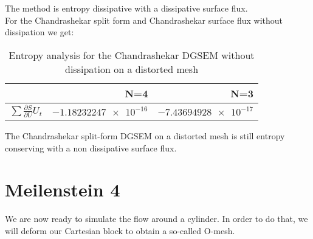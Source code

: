 \documentclass[11pt]{scrartcl}
\begin{document}
The method is entropy dissipative with a dissipative surface flux.\\
For the Chandrashekar split form and Chandrashekar surface flux without dissipation we get: \\
\begin{table}[H]
\centering
\begin{tabular}{|r|r|r|}
    \hline\hline
     & \textbf{N=4} & \textbf{N=3} \\\hline
    $\sum \frac{\partial S}{\partial U} U_t$ & $\num{-1.18232247e-16}$ & $\num{-7.43694928e-17}$ \\\hline\hline
\end{tabular}
\caption{Entropy analysis for the Chandrashekar DGSEM without dissipation on a distorted mesh}
\end{table}
The Chandrashekar split-form DGSEM  on a distorted mesh is still entropy conserving with a non dissipative surface flux. 


\newpage
\section{Meilenstein 4}
We are now ready to simulate the flow around a cylinder. In order to do that, we will deform our Cartesian block to obtain a so-called O-mesh.
\end{document}
